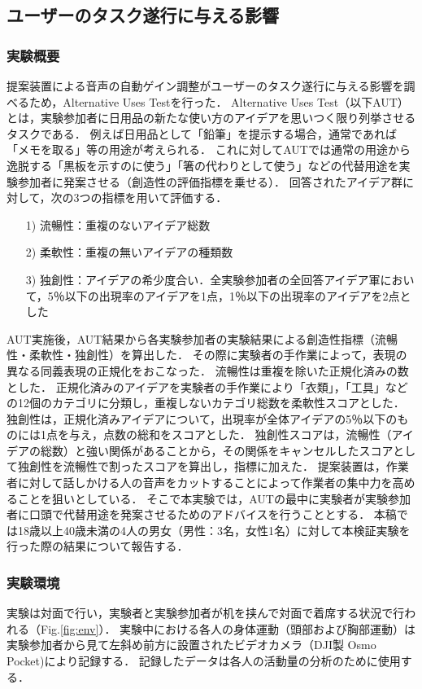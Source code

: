 \documentclass[a4paper]{jarticle}
\begin{document}
\subsection{ユーザーのタスク遂行に与える影響}
\subsubsection{実験概要}
提案装置による音声の自動ゲイン調整がユーザーのタスク遂行に与える影響を調べるため，Alternative Uses Test\cite{AUT}を行った．
Alternative Uses Test（以下AUT）とは，実験参加者に日用品の新たな使い方のアイデアを思いつく限り列挙させるタスクである．
例えば日用品として「鉛筆」を提示する場合，通常であれば「メモを取る」等の用途が考えられる．
これに対してAUTでは通常の用途から逸脱する「黒板を示すのに使う」「箸の代わりとして使う」などの代替用途を実験参加者に発案させる（創造性の評価指標を乗せる）．
回答されたアイデア群に対して，次の3つの指標を用いて評価する．
\begin{enumerate}
    \item[1)]流暢性：重複のないアイデア総数
    \item[2)]柔軟性：重複の無いアイデアの種類数
    \item[3)]独創性：アイデアの希少度合い．全実験参加者の全回答アイデア軍において，5％以下の出現率のアイデアを1点，1％以下の出現率のアイデアを2点とした
\end{enumerate}

AUT実施後，AUT結果から各実験参加者の実験結果による創造性指標（流暢性・柔軟性・独創性）を算出した．
その際に実験者の手作業によって，表現の異なる同義表現の正規化をおこなった．
流暢性は重複を除いた正規化済みの数とした．
正規化済みのアイデアを実験者の手作業により「衣類」，「工具」などの12個のカテゴリに分類し，重複しないカテゴリ総数を柔軟性スコアとした．
独創性は，正規化済みアイデアについて，出現率が全体アイデアの5％以下のものには1点を与え，点数の総和をスコアとした．
独創性スコアは，流暢性（アイデアの総数）と強い関係があることから，その関係をキャンセルしたスコアとして独創性を流暢性で割ったスコアを算出し，指標に加えた\cite{AUT2}．
提案装置は，作業者に対して話しかける人の音声をカットすることによって作業者の集中力を高めることを狙いとしている．
そこで本実験では，AUTの最中に実験者が実験参加者に口頭で代替用途を発案させるためのアドバイスを行うこととする．
本稿では18歳以上40歳未満の4人の男女（男性：3名，女性1名）に対して本検証実験を行った際の結果について報告する．
\subsubsection{実験環境}
実験は対面で行い，実験者と実験参加者が机を挟んで対面で着席する状況で行われる（Fig.\ref{fig:env}）．
実験中における各人の身体運動（頭部および胸部運動）は実験参加者から見て左斜め前方に設置されたビデオカメラ（DJI製 Osmo Pocket)により記録する．
記録したデータは各人の活動量の分析のために使用する．
\end{document}
